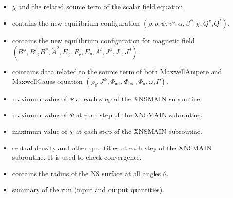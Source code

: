 \documentclass[letterpaper,10pt,english]{sphinxmanual}
\begin{document}
\begin{itemize}
\item {} 
\sphinxAtStartPar
{} \sphinxhyphen{} \(\chi\) and the related source term of the scalar field equation.


\item {} 
\sphinxAtStartPar
{} \sphinxhyphen{} contains the new equilibrium configuration \((\rho,p,\psi,v^\phi,\alpha,\beta^\phi,\chi,Q^r,Q^t)\).


\item {} 
\sphinxAtStartPar
{} \sphinxhyphen{} contains the new equilibrium configuration for magnetic field \((B^\phi,B^r,B^\theta,\tilde A ^\phi,E_\phi,E_r,E_\theta,A^t,J^\phi,J^r,J^\theta)\).


\item {} 
\sphinxAtStartPar
{} \sphinxhyphen{} cointains data related to the source term of both Maxwell\sphinxhyphen{}Ampere and Maxwell\sphinxhyphen{}Gauss equation \((\rho _\mathrm{e},J^\phi,\Phi _\mathrm{int},\Phi _\mathrm{ext},\Phi _\mathrm{a},\omega,\Gamma)\).


\item {} 
\sphinxAtStartPar
{} \sphinxhyphen{} maximum value of \(\Psi\) at each step of the XNSMAIN subroutine.


\item {} 
\sphinxAtStartPar
{} \sphinxhyphen{} maximum value of \(\Phi\) at each step of the XNSMAIN subroutine.


\item {} 
\sphinxAtStartPar
{} \sphinxhyphen{} maximum value of \(\chi\) at each step of the XNSMAIN subroutine.


\item {} 
\sphinxAtStartPar
{} \sphinxhyphen{} central density and other quantities at each step of the XNSMAIN subroutine. It is used to check convergence.


\item {} 
\sphinxAtStartPar
{} \sphinxhyphen{} contains the radius of the NS surface at all angles \(\theta\).


\item {} 
\sphinxAtStartPar
{} \sphinxhyphen{} summary of the run (input and output quantities).

\end{itemize}
\end{document}
